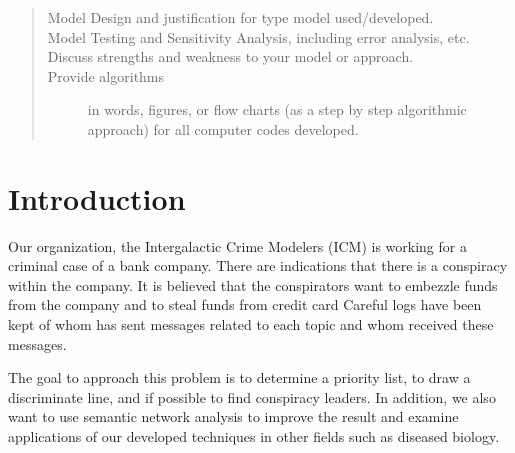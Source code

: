 \documentclass{icmmcm}
\begin{document}
\begin{summary}
\begin{quotation}
\begin{description}
\item[Model Design and justification for type model used/developed.]

\item[Model Testing and Sensitivity Analysis, including error
  analysis, etc.]

\item[Discuss strengths and weakness to your model or approach.]

\item[Provide algorithms] in words, figures, or flow charts (as a step
  by step algorithmic approach) for all computer codes developed.
\end{description}
 \citep{comap-mcm-rules}
\end{quotation}

\end{summary}
 


\maketitle
\tableofcontents

\listoffigures
\listoftables  
 

\section{Introduction}%
\label{sec:introduction}


Our organization, the Intergalactic Crime Modelers (ICM) is working
for a criminal case of a bank company.  
There are indications that there is a conspiracy within the company. 
It is believed that the conspirators want to embezzle funds from
the company and to steal funds from credit card 
Careful logs have been kept of whom has sent messages related to each
topic and whom received these messages.

The goal to approach this problem is to determine a priority list, 
to draw a discriminate line, and if possible to find
conspiracy leaders. In addition, we also want to use semantic
network analysis to improve the result and examine applications of
our developed techniques in other fields such as diseased biology.
\end{document}
